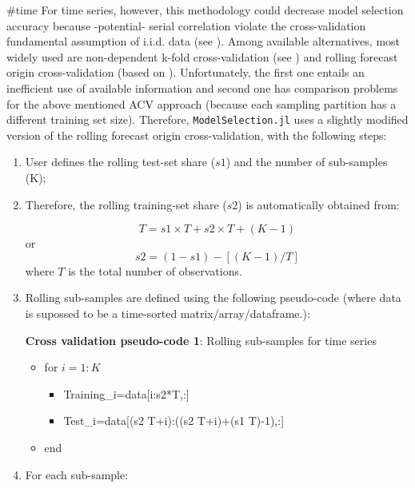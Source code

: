 \documentclass{article}
\begin{document}
{{#time}}
For time series, however, this methodology could decrease model selection accuracy because -potential- serial correlation violate the cross-validation fundamental assumption of i.i.d. data (see \cite{bergmeir2012}). Among available alternatives, most widely used are non-dependent k-fold cross-validation (see \cite{bergmeir2018}) and rolling forecast origin cross-validation (based on \cite{hyndman2013}). Unfortunately, the  first one entails an inefficient use of available information and second one has comparison problems for the above mentioned ACV approach (because each sampling partition has a different training set size). Therefore, \verb|ModelSelection.jl| uses a slightly modified version of the rolling forecast origin cross-validation, with the following steps:


\begin{enumerate}
\item User defines the rolling test-set share ($s1$) and the number of sub-samples (K);
\item Therefore, the rolling training-set share ($s2$) is automatically obtained from:

\begin{equation}
  T=s1 \times T+s2 \times T+(K-1)
\end{equation}
or
\begin{equation}
  s2=(1-s1)-[(K-1)/T]
\end{equation}
where $T$ is the total number of observations.
\item Rolling sub-samples are defined using the following pseudo-code (where data is supossed to be a time-sorted matrix/array/dataframe.):

\begin{algorithm}
\caption*{\textbf{Cross validation pseudo-code 1}: Rolling sub-samples for time series}
\begin{itemize}
  \item[] for $i=1:K$
  \begin{itemize}
    \item[]  Training\_i=data[i:s2*T,:]
    \item[] Test\_i=data[(s2 \times T+i):((s2 \times T+i)+(s1 \times T)-1),:]
  \end{itemize}
  \item[] end
\end{itemize}
\end{algorithm}

\item For each sub-sample:


\end{enumerate}
\end{document}
